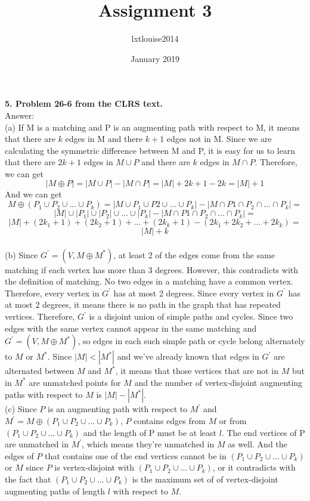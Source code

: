 \documentclass{article}
\title{Assignment 3}
\author{lxtlouise2014 }
\date{January 2019}
\begin{document}
\maketitle
\textbf{5. Problem 26-6 from the CLRS text.} \\
\noindent
Answer: \\
(a) If M is a matching and P is an augmenting path with respect to M, it means that there are $k$ edges in M and there $k + 1$ edges not in M. Since we are calculating the symmetric difference between M and P, it is easy for us to learn that there are $2k + 1$ edges in $M\cup P$ and there are $k$ edges in $M\cap P$. Therefore, we can get $$|M \oplus P| = |M\cup P| - |M\cap P| = |M| + 2k + 1 - 2k = |M| + 1$$ And we can get $$M \oplus (P_1\cup P_2 \cup ... \cup P_k )  = |M\cup P_1\cup P2\cup ... \cup P_k| - |M\cap P1\cap P_2\cap ... \cap P_k| = $$ $$|M|\cup |P_1|\cup |P_2|\cup ... \cup |P_k| -  |M\cap P1\cap P_2\cap ... \cap P_k| = $$ $$|M| + (2k_1 + 1) + (2k_2 + 1) + ... + (2k_k + 1) - (2k_1 + 2k_2 + ... + 2k_k) = $$ $$|M| + k$$ \\
(b) Since $G^{'} = (V, M\oplus M^{*})$, at least 2 of the edges come from the same matching if each vertex has more than 3 degrees. However, this contradicts with the definition of matching. No two edges in a matching have a common vertex. Therefore, every vertex in $G^{'}$ has at most 2 degrees. Since every vertex in $G^{'}$ has at most 2 degrees, it means there is no path in the graph that has repeated vertices. Therefore, $G^{'}$ is a disjoint union of simple paths and cycles. Since two edges with the same vertex cannot appear in the same matching and $G^{'} = (V, M\oplus M^{*})$, so edges in each such simple path or cycle belong alternately to $M$ or $M^{*}$. Since $|M| < |M^{*}|$ and we've already known that edges in $G^{'}$ are alternated between $M$ and $M^{*}$, it means that those vertices that are not in $M$ but in $M^{*}$ are unmatched points for $M$ and the number of vertex-disjoint augmenting paths with respect to $M$ is $|M| - |M^{*}|$.\\ \newline
(c) Since $P$ is an augmenting path with respect to $M^{'}$ and $M^{'} = M\oplus (P_1\cup P_2\cup ... \cup P_k)$, $P$ contains edges from $M$ or from $(P_1\cup P_2\cup ... \cup P_k)$ and the length of P must be at least $l$. The end vertices of P are unmatched in $M^{'}$, which means they're unmatched in $M$ as well. And the edges of $P$ that contains one of the end vertices cannot be in $(P_1\cup P_2\cup ... \cup P_k)$ or $M$ since $P$ is vertex-disjoint with $(P_1\cup P_2\cup ... \cup P_k)$, or it contradicts with the fact that $(P_1\cup P_2\cup ... \cup P_k)$ is the maximum set of of vertex-disjoint augmenting paths of length $l$ with respect to $M$.\\ \newline
\end{document}
